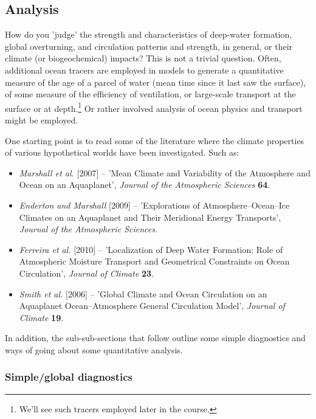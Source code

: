 \documentclass[11pt,fleqn]{book} %
\begin{document}

\subsection{Analysis}

How do you 'judge' the strength and characteristics of deep-water formation, global overturning, and circulation patterns and strength, in general, or their climate (or biogeochemical) impacts? This is not a trivial question. Often, additional ocean tracers are employed in models to generate a quantitative measure of the age of a parcel of water (mean time since it last saw the surface), of some measure of the efficiency of ventilation, or large-scale transport at the surface or at depth.\footnote{We'll see such tracers employed later in the course.} Or rather involved analysis of ocean physics and transport might be employed.

One starting point is to read some of the literature where the climate properties of various hypothetical worlds have been investigated. Such as:

\begin{itemize}[noitemsep]
\item \textit{Marshall et al.} [2007] -- 'Mean Climate and Variability of the Atmosphere and Ocean on an Aquaplanet', \textit{Journal of the Atmospheric Sciences} \textbf{64}.
\item \textit{Enderton and Marshall} [2009] -- 'Explorations of Atmosphere--Ocean--Ice Climates on an Aquaplanet and Their Meridional Energy Transports', \textit{Journal of the Atmospheric Sciences}.
\item \textit{Ferreira et al.} [2010] -- 'Localization of Deep Water Formation: Role of Atmospheric Moisture Transport and Geometrical Constraints on Ocean Circulation', \textit{Journal of Climate} \textbf{23}.
\item \textit{Smith et al.} [2006] -- 'Global Climate and Ocean Circulation on an Aquaplanet Ocean–Atmosphere General Circulation Model',  \textit{Journal of Climate} \textbf{19}.
\end{itemize}

In addition, the sub-sub-sections that follow outline some simple diagnostics and ways of going about some quantitative analysis.


\subsubsection{Simple/global diagnostics}
\end{document}
